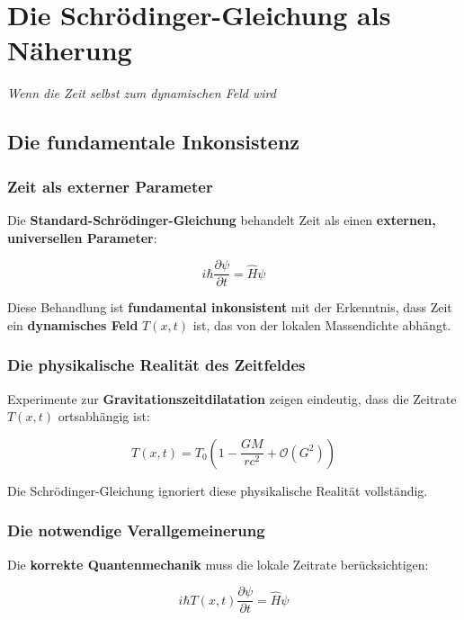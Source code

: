\documentclass[12pt,a4paper]{report}
\begin{document}
	\chapter{Die Schrödinger-Gleichung als Näherung}
	\textit{Wenn die Zeit selbst zum dynamischen Feld wird}
	
	\section{Die fundamentale Inkonsistenz}
	
	\subsection{Zeit als externer Parameter}
	
	Die \textbf{Standard-Schrödinger-Gleichung} behandelt Zeit als einen \textbf{externen, universellen Parameter}:
	
	\begin{equation}
		i\hbar\frac{\partial\psi}{\partial t} = \hat{H}\psi
	\end{equation}
	
	Diese Behandlung ist \textbf{fundamental inkonsistent} mit der Erkenntnis, dass Zeit ein \textbf{dynamisches Feld} $T(x,t)$ ist, das von der lokalen Massendichte abhängt.
	
	\subsection{Die physikalische Realität des Zeitfeldes}
	
	Experimente zur \textbf{Gravitationszeitdilatation} zeigen eindeutig, dass die Zeitrate $T(x,t)$ ortsabhängig ist:
	
	\begin{equation}
		T(x,t) = T_0\left(1 - \frac{GM}{rc^2} + \mathcal{O}(G^2)\right)
	\end{equation}
	
	Die Schrödinger-Gleichung ignoriert diese physikalische Realität vollständig.
	
	\subsection{Die notwendige Verallgemeinerung}
	
	Die \textbf{korrekte Quantenmechanik} muss die lokale Zeitrate berücksichtigen:
	
	\begin{equation}
		i\hbar T(x,t)\frac{\partial\psi}{\partial t} = \hat{H}\psi
	\end{equation}
	
\end{document}
